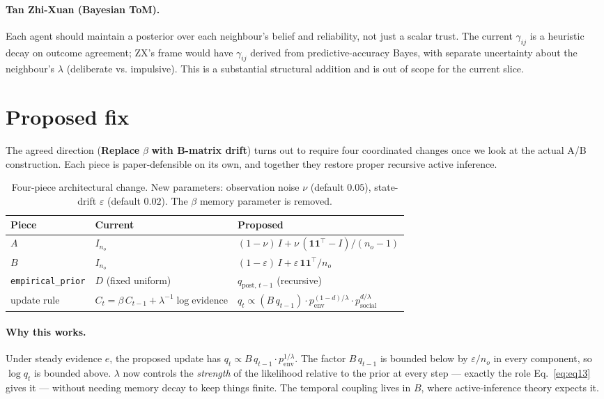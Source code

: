 \documentclass[11pt,a4paper]{article}
\newcommand{\code}[1]{\texttt{\small #1}}
\begin{document}
\paragraph{Tan Zhi-Xuan (Bayesian ToM).} Each agent should maintain a
posterior over each neighbour's belief and reliability, not just a scalar
trust. The current $\gamma_{ij}$ is a heuristic decay on outcome agreement;
ZX's frame would have $\gamma_{ij}$ derived from predictive-accuracy Bayes,
with separate uncertainty about the neighbour's $\lambda$ (deliberate vs.
impulsive). This is a substantial structural addition and is out of scope for
the current slice.

\section{Proposed fix}
\label{sec:fix}

The agreed direction (\textbf{Replace} $\beta$ \textbf{with B-matrix drift})
turns out to require four coordinated changes once we look at the actual A/B
construction. Each piece is paper-defensible on its own, and together they
restore proper recursive active inference.

\begin{table}[h]
\centering
\small
\begin{tabular}{@{}l p{55mm} p{55mm}@{}}
\toprule
\textbf{Piece} & \textbf{Current} & \textbf{Proposed} \\
\midrule
$A$ & $I_{n_o}$ & $(1-\nu)\,I + \nu\,(\mathbf{1}\mathbf{1}^\top - I)/(n_o{-}1)$ \\
$B$ & $I_{n_o}$ & $(1-\varepsilon)\,I + \varepsilon\,\mathbf{1}\mathbf{1}^\top/n_o$ \\
\code{empirical\_prior} & $D$ (fixed uniform) & $q_{\text{post},\,t-1}$ (recursive) \\
update rule & $C_t = \beta\,C_{t-1} + \lambda^{-1}\!\log\text{evidence}$ &
   $q_t \propto (B\,q_{t-1}) \cdot p_{\text{env}}^{(1-d)/\lambda}\cdot
                 p_{\text{social}}^{d/\lambda}$ \\
\bottomrule
\end{tabular}
\caption{Four-piece architectural change. New parameters: observation noise
$\nu$ (default $0.05$), state-drift $\varepsilon$ (default $0.02$). The
$\beta$ memory parameter is removed.}
\label{tab:fix}
\end{table}

\paragraph{Why this works.} Under steady evidence $e$, the proposed
update has $q_t \propto B\,q_{t-1} \cdot p_{\text{env}}^{1/\lambda}$. The
factor $B\,q_{t-1}$ is bounded below by $\varepsilon/n_o$ in every component,
so $\log q_t$ is bounded above. $\lambda$ now controls the \emph{strength} of
the likelihood relative to the prior at every step --- exactly the role
Eq.~\ref{eq:eq13} gives it --- without needing memory decay to keep things
finite. The temporal coupling lives in $B$, where active-inference theory
expects it.
\end{document}
